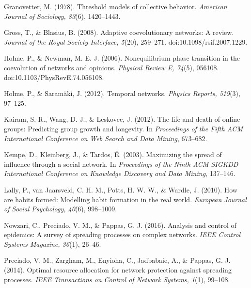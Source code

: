 \documentclass[11pt]{article}
\begin{document}
\begin{flushleft}
\noindent\hangindent=0.5in 

Granovetter, M. (1978). Threshold models of collective behavior. \textit{American Journal of Sociology, 83}(6), 1420–1443.

\noindent\hangindent=0.5in 

Gross, T., \& Blasius, B. (2008). Adaptive coevolutionary networks: A review. \textit{Journal of the Royal Society Interface, 5}(20), 259–271. doi:10.1098/rsif.2007.1229.

\noindent\hangindent=0.5in 

Holme, P., \& Newman, M. E. J. (2006). Nonequilibrium phase transition in the coevolution of networks and opinions. \textit{Physical Review E, 74}(5), 056108. doi:10.1103/PhysRevE.74.056108.

\noindent\hangindent=0.5in 

Holme, P., \& Saramäki, J. (2012). Temporal networks. \textit{Physics Reports, 519}(3), 97–125.

\noindent\hangindent=0.5in 

Kairam, S. R., Wang, D. J., \& Leskovec, J. (2012). The life and death of online groups: Predicting group growth and longevity. In \textit{Proceedings of the Fifth ACM International Conference on Web Search and Data Mining}, 673–682.

\noindent\hangindent=0.5in 

Kempe, D., Kleinberg, J., \& Tardos, É. (2003). Maximizing the spread of influence through a social network. In \textit{Proceedings of the Ninth ACM SIGKDD International Conference on Knowledge Discovery and Data Mining}, 137–146.

\noindent\hangindent=0.5in 

Lally, P., van Jaarsveld, C. H. M., Potts, H. W. W., \& Wardle, J. (2010). How are habits formed: Modelling habit formation in the real world. \textit{European Journal of Social Psychology, 40}(6), 998–1009.

\noindent\hangindent=0.5in 

Nowzari, C., Preciado, V. M., \& Pappas, G. J. (2016). Analysis and control of epidemics: A survey of spreading processes on complex networks. \textit{IEEE Control Systems Magazine, 36}(1), 26–46.

\noindent\hangindent=0.5in 

Preciado, V. M., Zargham, M., Enyioha, C., Jadbabaie, A., \& Pappas, G. J. (2014). Optimal resource allocation for network protection against spreading processes. \textit{IEEE Transactions on Control of Network Systems, 1}(1), 99–108.


\end{flushleft}
\end{document}
